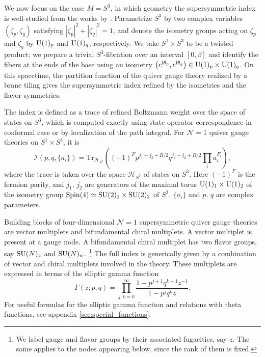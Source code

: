 We now focus on the case $M=S^{3}$, in which geometry the supersymmetric
index is well-studied from the works by \cite{Romelsberger:2005eg,Kinney:2005ej,Festuccia:2011ws}.
Parametrize $S^{3}$ by two complex variables
$(\zeta_{p},\zeta_{q})$ satisfying $|\zeta_{p}|^{2}+|\zeta_{q}|^{2}=1$,
and denote the isometry groups acting on $\zeta_{p}$ and $\zeta_{q}$
by $\mathrm{U}(1)_{p}$ and $\mathrm{U}(1)_{q}$, respectively. We take $S^{1}\times S^{3}$
to be a twisted product; we prepare a trivial $S^{3}$-fibration over
an interval $[0,\beta]$ and identify the fibers at the ends of the
base using an isometry $\left(e^{\mathrm{i}\theta_{p}},e^{\mathrm{i}\theta_{q}}\right)\in \mathrm{U}(1)_{p}\times \mathrm{U}(1)_{q}$.
On this spacetime, the partition function of the quiver gauge theory
realized by a brane tiling gives the supersymmetric index refined
by the isometries and the flavor symmetries.

The index is defined as a trace of refined Boltzmann weight over the
space of states on $S^{3}$, which is computed exactly using state-operator
correspondence in conformal case or by localization of the path integral.
For $\mathcal{N}=1$ quiver gauge theories on $S^{1}\times S^{3}$, it is
\begin{equation}
    \mathcal{I}(p,q,\{ a_{i}\} )
      =  \mathrm{Tr}_{\mathcal{H}_{S^{3}}}
      \left(    (-1)^{F}  p^{j_{1}+j_{2}+R/2}  q^{j_{1}-j_{2}+R/2}  \prod_{i}a_{i}^{F_{i}}    \right),
\end{equation}
where the trace is taken over the space $\mathcal{H}_{S^{3}}$ of states on $S^{3}$.
Here $\left(-1\right)^{F}$ is the fermion parity, and $j_{1},\,j_{2}$
are generators of the maximal torus $\mathrm{U}(1)_{1}\times \mathrm{U}(1)_{2}$ of
the isometry group $\mathrm{Spin}(4)\simeq \mathrm{SU}(2)_{1}\times \mathrm{SU}(2)_{2}$ of $S^{3}$,
$\{ a_i \}$ and $p,\,q$ are complex parameters.


Building blocks of four-dimensional $\mathcal{N}=1$ supersymmetric quiver gauge
theories are vector multiplets and bifundamental chiral multiplets.
A vector multiplet is present at a gauge node. A bifundamental chiral
multiplet has two flavor groups, say $\mathrm{SU}(N)_{z}$ and $\mathrm{SU}(N)_{w}$.%
%
\footnote{We label gauge and flavor groups by their associated fugacities, say $z$.
The same applies to the nodes appearing below, since the rank of them is fixed.}
%
The full index is generically given by a combination of vector and chiral
multiplets involved in the theory. These multiplets are expressed
in terms of the elliptic gamma function
\begin{equation}
    \Gamma(z;p,q)  =  \prod_{j,k=0}^{\infty}  \frac{1-p^{j+1}q^{k+1}z^{-1}}{1-p^{j}q^{k}z}
  .
\end{equation}
For useful formulas for the elliptic gamma function and
relations with theta functions, see appendix \ref{sec:special_functions}.




